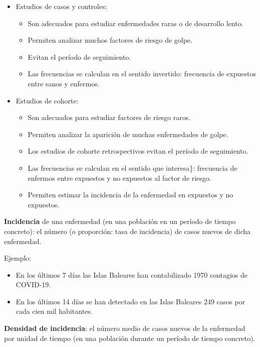 \documentclass[
  spanish,
  letterpaper,
  DIV=11,
  numbers=noendperiod]{scrreprt}
\begin{document}
\begin{itemize}
\item
  Estudios de casos y controles:

  \begin{itemize}
  \item
    Son adecuados para estudiar enfermedades raras o de desarrollo
    lento.
  \item
    Permiten analizar muchos factores de riesgo de golpe.
  \item
    Evitan el período de seguimiento.
  \item
    Las frecuencias se calculan en el sentido invertido: frecuencia de
    expuestos entre sanos y enfermos.
  \end{itemize}
\item
  Estudios de cohorte:

  \begin{itemize}
  \item
    Son adecuados para estudiar factores de riesgo raros.
  \item
    Permiten analizar la aparición de muchas enfermedades de golpe.
  \item
    Los estudios de cohorte retrospectivos evitan el período de
    seguimiento.
  \item
    Las frecuencias se calculan en el sentido que interesa\}: frecuencia
    de enfermos entre expuestos y no expuestos al factor de riesgo.
  \item
    Permiten estimar la incidencia de la enfermedad en expuestos y no
    expuestos.
  \end{itemize}
\end{itemize}

\textbf{Incidencia} de una enfermedad (en una población en un período de
tiempo concreto): el número (o proporción: tasa de incidencia) de casos
{ nuevos } de dicha enfermedad.

Ejemplo:

\begin{itemize}
\item
  En los últimos 7 días las Islas Baleares han contabilizado 1970
  contagios de COVID-19.
\item
  En los últimos 14 días se han detectado en las Islas Baleares 249
  casos por cada cien mil habitantes.
\end{itemize}

\textbf{Densidad de incidencia}: el número { medio } de casos nuevos de
la enfermedad por unidad de tiempo (en una población durante un período
de tiempo concreto).
\end{document}
